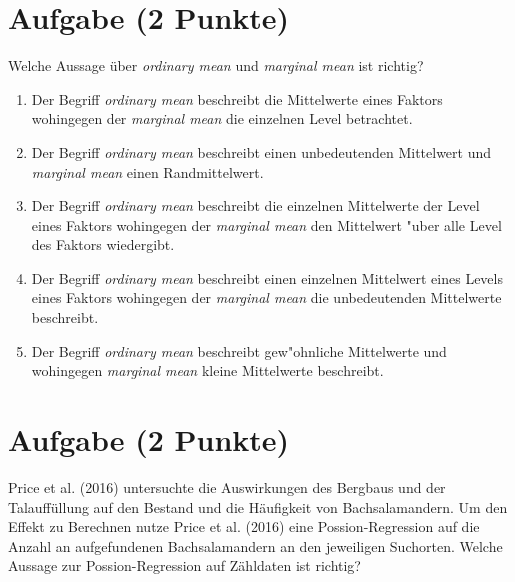 \documentclass[a4paper, 10pt]{scrartcl}\usepackage[]{graphicx}\usepackage[]{xcolor}
\begin{document}
\section{Aufgabe \hfill (2 Punkte)}

Welche Aussage {\"u}ber \textit{ordinary mean} und \textit{marginal mean} ist richtig? 



\begin{enumerate}
\item [\textbf{A} \msquare] Der Begriff \textit{ordinary mean} beschreibt die Mittelwerte eines Faktors wohingegen der \textit{marginal mean} die einzelnen Level betrachtet.
\item [\textbf{B} \msquare] Der Begriff \textit{ordinary mean} beschreibt einen unbedeutenden Mittelwert und \textit{marginal mean} einen Randmittelwert.
\item [\textbf{C} \msquare] Der Begriff \textit{ordinary mean} beschreibt die einzelnen Mittelwerte der Level eines Faktors wohingegen der \textit{marginal mean} den Mittelwert {"u}ber alle Level des Faktors wiedergibt.
\item [\textbf{D} \msquare] Der Begriff \textit{ordinary mean} beschreibt einen einzelnen Mittelwert eines Levels eines Faktors wohingegen der \textit{marginal mean} die unbedeutenden Mittelwerte beschreibt.
\item [\textbf{E} \msquare] Der Begriff \textit{ordinary mean} beschreibt gew{"o}hnliche Mittelwerte und wohingegen \textit{marginal mean} kleine Mittelwerte beschreibt.
\end{enumerate} 

\section{Aufgabe \hfill (2 Punkte)}

Price et al. (2016) untersuchte die Auswirkungen des Bergbaus und der
Talauff{\"u}llung auf den Bestand und die H{\"a}ufigkeit von Bachsalamandern. Um
den Effekt zu Berechnen nutze Price et al. (2016) eine Possion-Regression
auf die Anzahl an aufgefundenen Bachsalamandern an den jeweiligen
Suchorten. Welche Aussage zur Possion-Regression auf Z{\"a}hldaten ist richtig?
\end{document}
